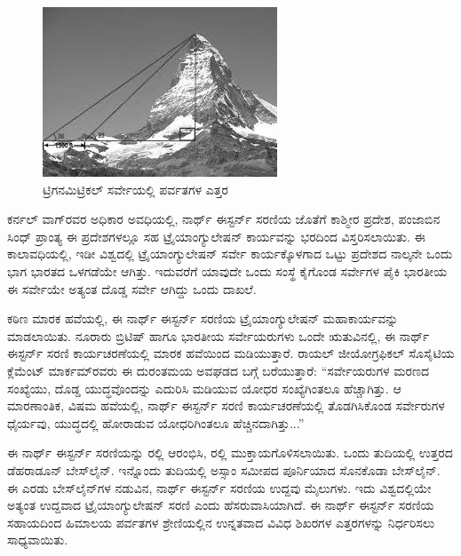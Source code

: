 \begin{figure}[!htbp]
\includegraphics{"images/image018.jpg"}
\caption{ಟ್ರಿಗನಮಿಟ್ರಿಕಲ್​ ಸರ್ವೇಯಲ್ಲಿ ಪರ್ವತಗಳ ಎತ್ತರ}\label{art14-fig1}
\end{figure}

ಕರ್ನಲ್​ ವಾಗ್​ರವರ ಅಧಿಕಾರ ಅವಧಿಯಲ್ಲಿ, ನಾರ್ಥ್ ಈಸ್ಟರ್ನ್ ಸರಣಿಯ ಜೊತೆಗೆ ಕಾಶ್ಮೀರ ಪ್ರದೇಶ, ಪಂಜಾಬಿನ ಸಿಂಧ್​ ಪ್ರಾಂತ್ಯ ಈ ಪ್ರದೇಶಗಳಲ್ಲೂ ಸಹ ಟ್ರೈಯಾಂಗ್ಯುಲೇಷನ್​ ಕಾರ್ಯವನ್ನು ಭರದಿಂದ ವಿಸ್ತರಿಸಲಾಯಿತು. ಈ ಕಾಲಾವಧಿಯಲ್ಲಿ, ಇಡೀ ವಿಶ್ವದಲ್ಲಿ ಟ್ರೈಯಾಂಗ್ಯುಲೇಷನ್​ ಸರ್ವೇ ಕಾರ್ಯಕ್ಕೊಳಗಾದ ಒಟ್ಟು ಪ್ರದೇಶದ ನಾಲ್ಕನೇ ಒಂದು ಭಾಗ ಭಾರತದ ಒಳಗಡೆಯೇ ಆಗಿತ್ತು. ಇದುವರೆಗೆ ಯಾವುದೇ ಒಂದು ಸಂಸ್ಥೆ ಕೈಗೊಂಡ ಸರ್ವೇಗಳ ಪೈಕಿ ಭಾರತೀಯ ಈ ಸರ್ವೇಯೇ ಅತ್ಯಂತ ದೊಡ್ಡ ಸರ್ವೇ ಆಗಿದ್ದು ಒಂದು ದಾಖಲೆ.

\vskip 4pt

ಕಠಿಣ ಮಾರಕ ಹವೆಯಲ್ಲಿ, ಈ ನಾರ್ಥ್ ಈಸ್ಟರ್ನ್ ಸರಣಿಯ ಟ್ರೈಯಾಂಗ್ಯುಲೇಷನ್​ ಮಹಾಕಾರ್ಯವನ್ನು ಮಾಡಲಾಯಿತು. ನೂರಾರು ಬ್ರಿಟಿಷ್​ ಹಾಗೂ ಭಾರತೀಯ ಸರ್ವೇಯರುಗಳು ಒಂದೇ ಋತುವಿನಲ್ಲಿ, ಈ ನಾರ್ಥ್ ಈಸ್ಟರ್ನ್ ಸರಣಿ ಕಾರ್ಯಚರಣೆಯಲ್ಲಿ ಮಾರಕ ಹವೆಯಿಂದ ಮಡಿಯುತ್ತಾರೆ. ರಾಯಲ್​ ಜೀಯೋಗ್ರಫಿಕಲ್​ ಸೊಸೈಟಿಯ ಕ್ಲೆಮೆಂಟ್​ ಮಾರ್ಕಮ್‌ರವರು ಈ ದುರಂತಮಯ ಅವಘಡದ ಬಗ್ಗೆ ಬರೆಯುತ್ತಾರೆ: “ಸರ್ವೇಯರುಗಳ ಮರಣದ ಸಂಖ್ಯೆಯು, ದೊಡ್ಡ ಯುದ್ಧವೊಂದನ್ನು ಎದುರಿಸಿ ಮಡಿಯುವ ಯೋಧರ ಸಂಖ್ಯೆಗಿಂತಲೂ ಹೆಚ್ಚಾಗಿತ್ತು. ಆ ಮಾರಣಾಂತಿಕ, ವಿಷಮ ಹವೆಯಲ್ಲಿ, ನಾರ್ಥ್ ಈಸ್ಟರ್ನ್ ಸರಣಿ ಕಾರ್ಯಚರಣೆಯಲ್ಲಿ ತೊಡಗಿಸಿಕೊಂಡ ಸರ್ವೇರುಗಳ ಧೈರ್ಯವು, ಯುದ್ಧದಲ್ಲಿ ಹೋರಾಡುವ ಯೋಧರಿಗಿಂತಲೂ ಹೆಚ್ಚಿನದಾಗಿತ್ತು...”

\newpage

ಈ ನಾರ್ಥ್ ಈಸ್ಟರ್ನ್ ಸರಣಿಯನ್ನು  ರಲ್ಲಿ ಆರಂಭಿಸಿ,  ರಲ್ಲಿ ಮುಕ್ತಾಯಗೊಳಿಸಲಾಯಿತು. ಒಂದು ತುದಿಯಲ್ಲಿ ಉತ್ತರದ ಡೆಹರಾಡೂನ್​ ಬೇಸ್‌ಲೈನ್​. ಇನ್ನೊಂದು ತುದಿಯಲ್ಲಿ ಅಸ್ಸಾಂ ಸಮೀಪದ ಪೂರ್ನಿಯಾದ ಸೊನಕೊಡಾ ಬೇಸ್‌ಲೈನ್​. ಈ ಎರಡು ಬೇಸ್‌ಲೈನ್​ಗಳ ನಡುವಿನ, ನಾರ್ಥ್ ಈಸ್ಟರ್ನ್ ಸರಣಿಯ ಉದ್ದವು  ಮೈಲುಗಳು. ಇದು ವಿಶ್ವದಲ್ಲಿಯೇ ಅತ್ಯಂತ ಉದ್ದವಾದ ಟ್ರೈಯಾಂಗ್ಯುಲೇಷನ್​ ಸರಣಿ ಎಂದು ಹೆಸರುವಾಸಿಯಾಗಿದೆ. ಈ ನಾರ್ಥ್ ಈಸ್ಟರ್ನ್ ಸರಣಿಯ ಸಹಾಯದಿಂದ ಹಿಮಾಲಯ ಪರ್ವತಗಳ ಶ್ರೇಣಿಯಲ್ಲಿನ ಉನ್ನತವಾದ  ವಿವಿಧ ಶಿಖರಗಳ ಎತ್ತರಗಳನ್ನು ನಿರ್ಧರಿಸಲು ಸಾಧ್ಯವಾಯಿತು.

